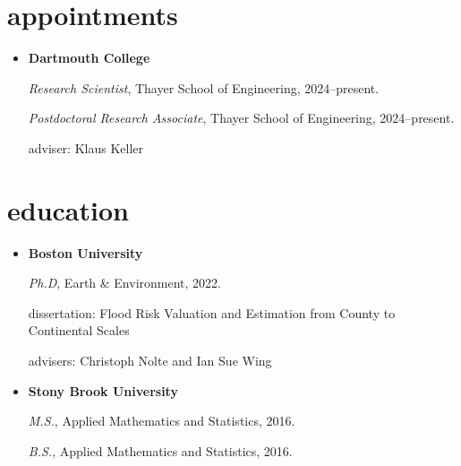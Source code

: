 \documentclass[10pt,oneside]{article}
\begin{document}

\section{appointments}

\mbox{}\vspace{-\dimexpr\baselineskip\relax}

\begin{itemize}[label={}]
  
  \item \textbf{Dartmouth College}
        
        \textit{Research Scientist}, Thayer School of Engineering, 2024--present.
        
        
        \textit{Postdoctoral Research Associate}, Thayer School of Engineering, 2024--present.
        
        adviser: Klaus Keller
        
        
        
\end{itemize}


\section{education}

\mbox{}\vspace{-\dimexpr\baselineskip\relax}

\begin{itemize}[label={}]
  
  \item \textbf{Boston University}
        
        \textit{Ph.D}, Earth \& Environment, 2022.
        
        
        dissertation: Flood Risk Valuation and Estimation from County to Continental Scales
        
        advisers: Christoph Nolte and Ian Sue Wing
        
        
  \item \textbf{Stony Brook University}
        
        \textit{M.S.}, Applied Mathematics and Statistics, 2016.
        
        \textit{B.S.}, Applied Mathematics and Statistics, 2016.
        
        
        
\end{itemize}
\end{document}
